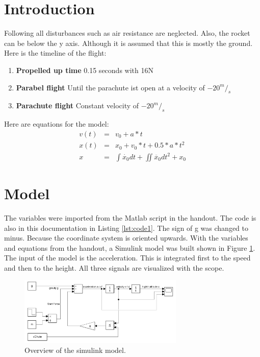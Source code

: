 %
%
%
\section{Introduction}
Following all disturbances such as air resistance are neglected. Also, the rocket can be below the y axis. Although it is assumed that this is mostly the ground.\\
Here is the timeline of the flight:

	\begin{enumerate}
		\item \textbf{Propelled up time} 0.15 seconds with 16N
		\item \textbf{Parabel flight} Until the parachute ist open at a velocity of $-20^m/_s$
		\item \textbf{Parachute flight} Constant velocity of $-20^m/_s$
	\end{enumerate}
Here are equations for the model:
	\begin{eqnarray}
		v\left( t\right)  &=& v_0 + a * t\\
		x\left( t\right)  &=& x_0 + v_0 * t + 0.5 * a * t^2\\
		x &=& \int \dot{x_0}  dt + \iint \ddot{x_0}  dt^2 + x_0
	\end{eqnarray}
	
	
	
	
\section{Model}\label{sec:model}
The variables were imported from the Matlab script in the handout. The code is also in this documentation in Listing \ref{lst:code1}.
The sign of g was changed to minus. Because the coordinate system is oriented upwards.
With the variables and equations from the handout, a Simulink model was built shown in Figure \ref{fig:overview}.
The input of the model is the acceleration. This is integrated first to the speed and then to the height. All three signals are visualized with the scope.
	


	\begin{figure}[H]
		\centering
		\includegraphics[width=0.7\textwidth]{figures/overview.png}
		\caption{Overview of the simulink model.}
		\label{fig:overview}
	\end{figure}

